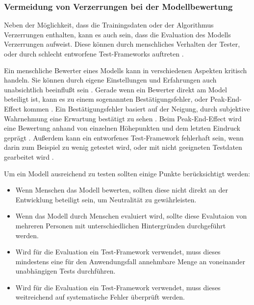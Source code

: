 \documentclass[12pt]{article}
\begin{document}
\subsubsection{Vermeidung von Verzerrungen bei der Modellbewertung}
Neben der Möglichkeit, dass die Trainingsdaten oder der Algorithmus Verzerrungen enthalten, kann es auch sein, dass die Evaluation des Modells Verzerrungen aufweist.
Diese können durch menschliches Verhalten der Tester, oder durch schlecht entworfene Test-Frameworks auftreten \cite{Srinivasan}.

Ein menschliche Bewerter eines Modells kann in verschiedenen Aspekten kritisch handeln. Sie können durch eigene Einstellungen und Erfahrungen auch unabsichtlich beeinflußt sein \cite{Srinivasan}.
Gerade wenn ein Bewerter direkt am Model beteiligt ist, kann es zu einem sogenannten Bestätigungsfehler, oder \glqq Peak-End-Effect\grqq{} kommen \cite{Srinivasan}. Ein Bestätigungsfehler basiert auf der Neigung, durch subjektive Wahrnehmung eine Erwartung bestätigt zu sehen \cite{Srinivasan}. Beim \glqq Peak-End-Effect\grqq{} wird eine Bewertung anhand von einzelnen Höhepunkten und dem letzten Eindruck geprägt \cite{Srinivasan}.
Außerdem kann ein entworfenes Test-Framework fehlerhaft sein, wenn darin zum Beispiel zu wenig getestet wird, oder mit nicht geeigneten Testdaten gearbeitet wird \cite{Srinivasan}.

Um ein Modell ausreichend zu testen sollten einige Punkte berücksichtigt werden:
\begin{itemize}
    \item Wenn Menschen das Modell bewerten, sollten diese nicht direkt an der Entwicklung beteiligt sein, um Neutralität zu gewährleisten.
    \item Wenn das Modell durch Menschen evaluiert wird, sollte diese Evalutaion von mehreren Personen mit unterschiedlichen Hintergründen durchgeführt werden.
    \item Wird für die Evaluation ein Test-Framework verwendet, muss dieses mindestens eine für den Anwendungsfall annehmbare Menge an voneinander unabhängigen Tests durchführen.
    \item Wird für die Evaluation ein Test-Framework verwendet, muss dieses weitreichend auf systematische Fehler überprüft werden.
\end{itemize}
\end{document}
